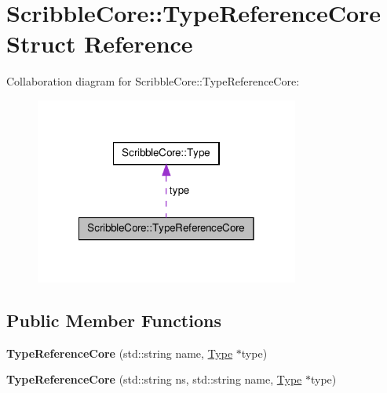 \hypertarget{struct_scribble_core_1_1_type_reference_core}{\section{Scribble\-Core\-:\-:Type\-Reference\-Core Struct Reference}
\label{struct_scribble_core_1_1_type_reference_core}
}


Collaboration diagram for Scribble\-Core\-:\-:Type\-Reference\-Core\-:
\nopagebreak
\begin{figure}[H]
\begin{center}
\leavevmode
\includegraphics[width=246pt]{struct_scribble_core_1_1_type_reference_core__coll__graph}
\end{center}
\end{figure}
\subsection*{Public Member Functions}
\begin{DoxyCompactItemize}
\item 
\hypertarget{struct_scribble_core_1_1_type_reference_core_ab9c58f694c3163be584e819417bbfca9}{{\bfseries Type\-Reference\-Core} (std\-::string name, \hyperlink{class_scribble_core_1_1_type}{Type} $\ast$type)}\label{struct_scribble_core_1_1_type_reference_core_ab9c58f694c3163be584e819417bbfca9}

\item 
\hypertarget{struct_scribble_core_1_1_type_reference_core_a5d26723df27dc125c4cf11c563d24a4e}{{\bfseries Type\-Reference\-Core} (std\-::string ns, std\-::string name, \hyperlink{class_scribble_core_1_1_type}{Type} $\ast$type)}\label{struct_scribble_core_1_1_type_reference_core_a5d26723df27dc125c4cf11c563d24a4e}

\end{DoxyCompactItemize}
